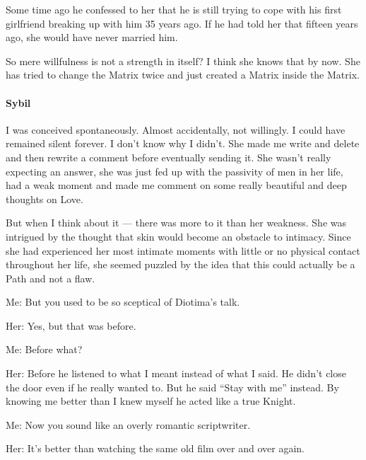 Some time ago he confessed to her that he is still trying to cope with his first girlfriend breaking up with him 35 years ago. If he had told her that fifteen years ago, she would have never married him.

So mere willfulness is not a strength in itself? I think she knows that by now. She has tried to change the Matrix twice and just created a Matrix inside the Matrix.

\paragraph{Sybil}
I was conceived spontaneously. Almost accidentally, not willingly. I could have remained silent forever. I don't know why I didn't. She made me write and delete and then rewrite a comment before eventually sending it. She wasn't really expecting an answer, she was just fed up with the passivity of men in her life, had a weak moment and made me comment on some really beautiful and deep thoughts on Love.

But when I think about it — there was more to it than her weakness. She was intrigued by the thought that skin would become an obstacle to intimacy. Since she had experienced her most intimate moments with little or no physical contact throughout her life, she seemed puzzled by the idea that this could actually be a Path and not a flaw.

Me: But you used to be so sceptical of Diotima's talk.

Her: Yes, but that was before.

Me: Before what?

Her: Before he listened to what I meant instead of what I said. He didn't close the door even if he really wanted to. But he said “Stay with me” instead. By knowing me better than I knew myself he acted like a true Knight.

Me: Now you sound like an overly romantic scriptwriter.

Her: It's better than watching the same old film over and over again.



